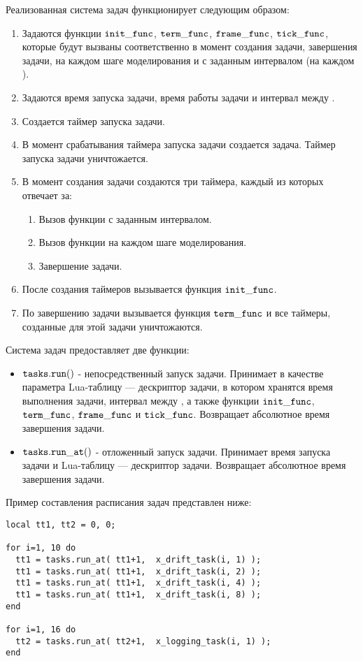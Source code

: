 Реализованная система задач функционирует следующим образом:
\begin{enumerate}
	\item 	Задаются функции $\tt init\_func$, $\tt term\_func$, $\tt frame\_func$, 
			$\tt tick\_func$, которые будут вызваны соответственно в момент создания задачи, 
			завершения задачи, на каждом шаге моделирования и с заданным интервалом 
			(на каждом ).
	\item	Задаются время запуска задачи, время работы задачи и интервал между .
	\item 	Создается таймер запуска задачи.
	\item 	В момент срабатывания таймера запуска задачи создается задача. 
			Таймер запуска задачи уничтожается.
	\item 	В момент создания задачи создаются три таймера, каждый из которых отвечает за:
	\begin{enumerate}
		\item	Вызов функции с заданным интервалом.
		\item	Вызов функции на каждом шаге моделирования.
		\item	Завершение задачи.
	\end{enumerate}	 
	\item 	После создания таймеров вызывается функция $\tt init\_func$.
	\item	По завершению задачи вызывается функция $\tt term\_func$ и все 
			таймеры, созданные для этой задачи уничтожаются.
\end{enumerate}

Система задач предоставляет две функции:
\begin{itemize}
	\item	$\tt tasks.run()$ - непосредственный запуск задачи. 
			Принимает в качестве параметра Lua-таблицу --- 
			дескриптор задачи, в котором хранятся время выполнения задачи, 
			интервал между , а также функции 
			$\tt init\_func$, $\tt term\_func$, $\tt frame\_func$ 
			и $\tt tick\_func$. Возвращает абсолютное время завершения задачи.
	\item	$\tt tasks.run\_at()$ - отложенный запуск задачи. 	
			Принимает время запуска задачи и Lua-таблицу --- дескриптор задачи. 
			Возвращает абсолютное время завершения задачи.
\end{itemize}

Пример составления расписания задач представлен ниже:

\begin{lstlisting}[caption={Пример создания расписания задач}]
local tt1, tt2 = 0, 0;

for i=1, 10 do
  tt1 = tasks.run_at( tt1+1,  x_drift_task(i, 1) );
  tt1 = tasks.run_at( tt1+1,  x_drift_task(i, 2) );
  tt1 = tasks.run_at( tt1+1,  x_drift_task(i, 4) );
  tt1 = tasks.run_at( tt1+1,  x_drift_task(i, 8) );
end

for i=1, 16 do
  tt2 = tasks.run_at( tt2+1,  x_logging_task(i, 1) );
end
\end{lstlisting}

